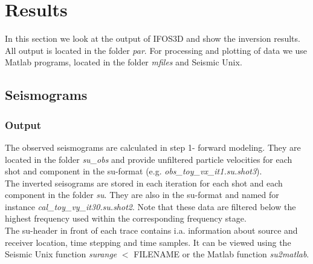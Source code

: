 \section{Results}
In this section we look at the output of IFOS3D and show the inversion results. All output is located in the folder \textit{par}. For processing and plotting of data we use Matlab programs, located in the folder \textit{mfiles} and Seismic Unix.
\subsection{Seismograms}
\subsubsection*{Output}
The observed seismograms are calculated in step 1- forward modeling. They are located in the folder \textit{su\_obs} and provide unfiltered particle velocities for each shot and component in the su-format (e.g. \textit{obs\_toy\_vx\_it1.su.shot3}). \\
The inverted seisograms are stored in each iteration for each shot and each component in the folder \textit{su}. They are also in the su-format and named for instance \textit{cal\_toy\_vy\_it30.su.shot2}. Note that these data are filtered below the highest frequency used within the corresponding frequency stage.\\
The su-header in front of each trace contains i.a. information about source and receiver location, time stepping and time samples. It can be viewed using the Seismic Unix function \textit{surange} $<$ FILENAME or the Matlab function \textit{su2matlab}. 
